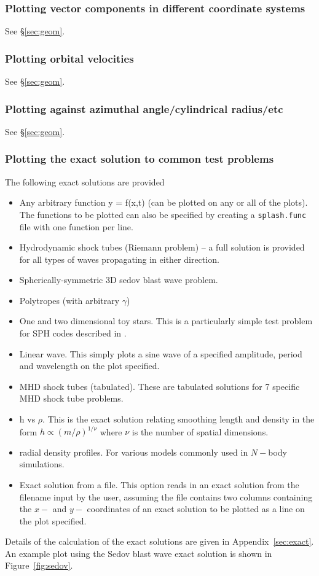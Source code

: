\documentclass[a4paper,10pt]{article}
\begin{document}
\subsubsection{ Plotting vector components in different coordinate systems}
See \S\ref{sec:geom}.

\subsubsection{ Plotting orbital velocities}
See \S\ref{sec:geom}.

\subsubsection{ Plotting against azimuthal angle/cylindrical radius/etc}
See \S\ref{sec:geom}.

\subsubsection{ Plotting the exact solution to common test problems}
\label{sec:exactsolns}
 The following exact solutions are provided
\begin{itemize}
\item Any arbitrary function y = f(x,t) (can be plotted on any or all of the plots). The functions to be plotted can also be specified by creating a \verb+splash.func+ file with one function per line.
\item Hydrodynamic shock tubes (Riemann problem) -- a full solution is provided for all types of waves propagating in either direction.
\item Spherically-symmetric 3D sedov blast wave problem.
\item Polytropes (with arbitrary $\gamma$)
\item One and two dimensional toy stars. This is a particularly simple test
problem for SPH codes described in \citet{mp04}.
\item Linear wave. This simply plots a sine wave of a specified amplitude, period and
wavelength on the plot specified.
\item MHD shock tubes (tabulated). These are tabulated solutions for 7 specific MHD
shock tube problems.
\item h vs $\rho$. This is the exact solution relating smoothing length and density in
the form $h \propto (m/\rho)^{1/\nu}$ where $\nu$ is the number of spatial dimensions.
\item radial density profiles. For various models commonly used in $N-$body simulations.
\item Exact solution from a file. This option reads in an exact solution from the
filename input by the user, assuming the file contains two columns containing the $x-$ and $y-$ coordinates of
an exact solution to be plotted as a line on the plot specified.
\end{itemize}
Details of the calculation of the exact solutions are given in Appendix~\ref{sec:exact}. An example plot using the Sedov blast wave exact solution is shown in Figure~\ref{fig:sedov}.
\end{document}
